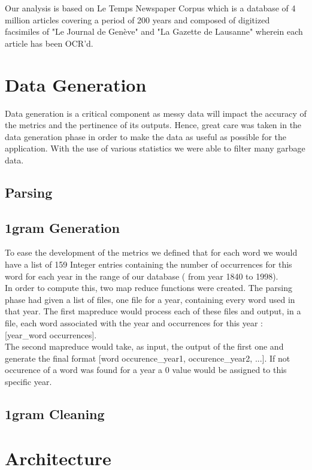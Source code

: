 \documentclass{article}
\begin{document}
Our analysis is based on Le Temps Newspaper Corpus which is a database of 4 million articles covering a period of 200 years and composed of digitized facsimiles of "Le Journal de Genève" and "La Gazette de Lausanne" wherein each article has been OCR'd.



\section{Data Generation}
Data generation is a critical component as messy data will impact the accuracy of the metrics and the pertinence of its outputs. Hence, great care was taken in the data generation phase in order to make the data as useful as possible for the application. With the use of various statistics we were able to filter many garbage data.

\subsection{Parsing}

\subsection{1gram Generation}
To ease the development of the metrics we defined that for each word we would have a list of 159 Integer entries containing the number of occurrences for this word for each year in the range of our database ( from year 1840 to 1998).\\

In order to compute this, two map reduce functions were created. The parsing phase had given a list of files, one file for a year, containing every word used in that year. The first mapreduce would process each of these files and output, in a file, each word associated with the year and occurrences for this year : [year\_word occurrences].\\

The second mapreduce would take, as input, the output of the first one and generate the final format [word occurence\_year1, occurence\_year2, ...]. If not occurence of a word was found for a year a 0 value would be assigned to this specific year.

\subsection{1gram Cleaning}

\section{Architecture}
\end{document}

